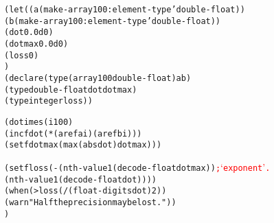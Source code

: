 \documentclass[../Example-Program.tex]{subfiles}
\begin{document}
\begin{alltt}
      (let ((a (make-array 100 :element-type 'double-float))
            (b (make-array 100 :element-type 'double-float))
            (dot 0.0d0)
            (dotmax 0.0d0)
            (loss 0)
           )
        (declare (type (array 100 double-float) a b)
                 (type double-float dot dotmax)
                 (type integer loss))
       
        (dotimes (i 100)
           (incf dot (* (aref a i) (aref b i)))
           (setf dotmax (max (abs dot) dotmax)))
  
        (setf loss (- (nth-value 1 (decode-float dotmax)) \textcolor{red}{; `exponent'.}
                      (nth-value 1 (decode-float dot))))
        (when (> loss (/ (float-digits dot) 2))
           (warn "Half the precision may be lost."))
        )
  \end{alltt}
\end{document}

